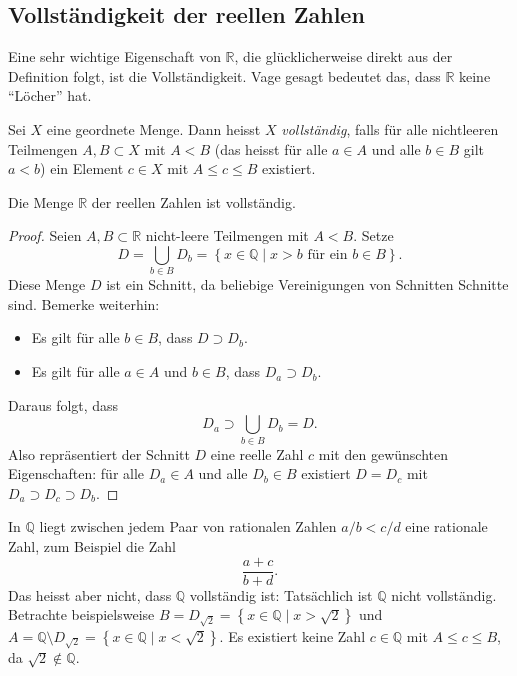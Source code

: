\documentclass[../main.tex]{subfiles}
\begin{document}
\subsection*{Vollständigkeit der reellen Zahlen}
Eine sehr wichtige Eigenschaft von $\mathbb{R}$, die
glücklicherweise direkt aus der Definition folgt,
ist die Vollständigkeit. Vage gesagt bedeutet das,
dass $\mathbb{R}$ keine ``Löcher'' hat.

\begin{definition}
	Sei $X$ 
	eine geordnete Menge. Dann heisst $X$ \emph{vollständig},
	falls für alle nichtleeren Teilmengen $A, B \subset X$
	mit $A < B$ (das heisst für alle $a \in A$ und alle $b \in B$
	gilt $a < b$) ein Element $c \in X$ mit $A \leq c \leq B$
	existiert.
\end{definition}

\begin{claim}
	Die Menge $\mathbb{R}$ der reellen Zahlen ist vollständig.
\end{claim}

\begin{proof}
  Seien $A, B \subset \mathbb{R}$ nicht-leere Teilmengen
  mit $A < B$.
  Setze
  \[
    D = \bigcup_{b \in B} D_b = \left\{x \in \mathbb{Q} \mid x > b
    \text{ für ein } b \in B \right\}.
  \]
  Diese Menge $D$ ist ein Schnitt,
  da beliebige Vereinigungen von Schnitten Schnitte sind.
  Bemerke weiterhin:
  \begin{itemize}
	  \item Es gilt für alle $b \in B$, dass $D \supset D_b$.
	  \item Es gilt für alle $a \in A$ und $b \in B$, dass
		  $D_a \supset D_b$.
  \end{itemize}
  Daraus folgt, dass 
	\[
	   D_a 
	   \supset 
	   \bigcup_{b \in B} D_b = D.
	\]
  Also repräsentiert der Schnitt $D$ eine reelle Zahl $c$
  mit den gewünschten Eigenschaften: für alle
  $D_a \in A$ und alle $D_b \in B$ existiert $D = D_c$
  mit $D_a \supset D_c \supset D_b$.
\end{proof}

\begin{remark}
  In $\mathbb Q$ liegt zwischen jedem Paar von rationalen Zahlen
  $a/b < c/d$ eine rationale Zahl, zum Beispiel die Zahl
  \[
    \frac{a+c}{b+d}.
  \]
  Das heisst aber nicht, dass $\mathbb Q$ vollständig ist:
  Tatsächlich ist $\mathbb{Q}$ nicht vollständig. Betrachte
  beispielsweise 
  $B= D_{\sqrt 2} = \left\{x \in \mathbb{Q} \mid x > \sqrt 2 \right\}$
  und $A = \mathbb{Q} \setminus D_{\sqrt 2}
  = \left\{x \in \mathbb{Q} \mid x < \sqrt 2\right\}$.
  Es existiert keine Zahl $c \in \mathbb{Q}$ mit $A \leq c \leq B$,
  da $\sqrt 2 \notin \mathbb{Q}$.
\end{remark}
\end{document}
